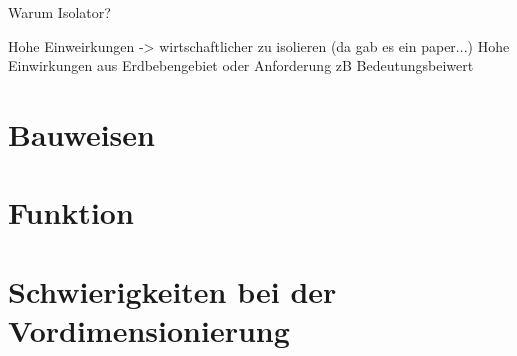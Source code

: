 Warum Isolator?

Hohe Einweirkungen -> wirtschaftlicher zu isolieren (da gab es ein paper...)
Hohe Einwirkungen aus Erdbebengebiet oder Anforderung zB Bedeutungsbeiwert


\section{Bauweisen}
\label{sec:bauwesien}

\pagebreak

\section{Funktion}
\label{sec:funktion}

\pagebreak

\section{Schwierigkeiten bei der Vordimensionierung}
\label{sec:schwierigkeitenvordimensionierung}

\pagebreak